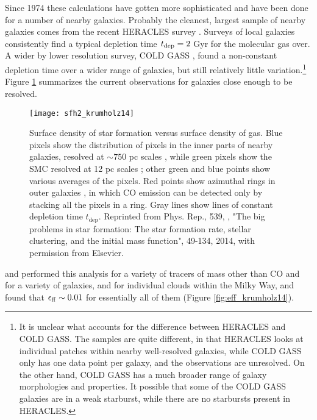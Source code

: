 Since 1974 these calculations have gotten more sophisticated and have been done for a number of nearby galaxies. Probably the cleanest, largest sample of nearby galaxies comes from the recent HERACLES survey \citep{leroy13a}. Surveys of local galaxies consistently find a typical depletion time $t_{\rm dep}=2$ Gyr for the molecular gas over. A wider by lower resolution survey, COLD GASS \citep{saintonge11a, saintonge11b}, found a non-constant depletion time over a wider range of galaxies, but still relatively little variation.\footnote{It is unclear what accounts for the difference between HERACLES and COLD GASS. The samples are quite different, in that HERACLES looks at individual patches within nearby well-resolved galaxies, while COLD GASS only has one data point per galaxy, and the observations are unresolved. On the other hand, COLD GASS has a much broader range of galaxy morphologies and properties. It possible that some of the COLD GASS galaxies are in a weak starburst, while there are no starbursts present in HERACLES.} Figure \ref{fig:sfh2_krumholz14} summarizes the current observations for galaxies close enough to be resolved.


\begin{figure}
\texttt{[image: sfh2\_krumholz14]}
\caption[Surface densities of gas and star formation]{
\label{fig:sfh2_krumholz14}
Surface density of star formation versus surface density of gas. Blue pixels show the distribution of pixels in the inner parts of nearby galaxies, resolved at $\sim 750$ pc scales \citet{leroy13a}, while green pixels show the SMC resolved at 12 pc scales \citet{bolatto11a}; other green and blue points show various averages of the pixels. Red points show azimuthal rings in outer galaxies \citet{schruba11a}, in which CO emission can be detected only by stacking all the pixels in a ring. Gray lines show lines of constant depletion time $t_{\mathrm{dep}}$. Reprinted from Phys. Rep., 539, \citeauthor{krumholz14c}, "The big problems in star formation: The star formation rate, stellar clustering, and the initial mass function", 49-134, 2014, with permission from Elsevier.
}
\end{figure}

\citet{krumholz07e} and \citet{krumholz12a} performed this analysis for a variety of tracers of mass other than CO and for a variety of galaxies, and for individual clouds within the Milky Way, and found that $\epsilon_{\rm ff}\sim 0.01$ for essentially all of them (Figure \ref{fig:eff_krumholz14}).

